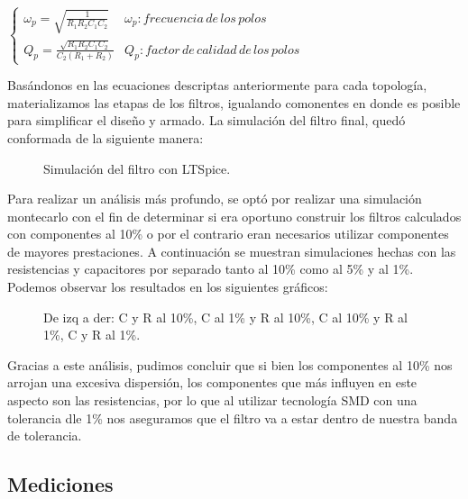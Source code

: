 \documentclass[../../ASSD_TP1_G7.tex]{subfiles}
\begin{document}
$\begin{cases}
\omega_{p}=\sqrt{\frac{1}{R_{1}R_{2}C_{1}C_{2}}} & \omega_{p}:frecuencia\,de\,los\,polos\\
Q_{p}=\frac{\sqrt{R_{1}R_{2}C_{1}C_{2}}}{C_{2}(R_{1}+R_{2})} & Q_{p}:factor\,de\,calidad\,de\,los\,polos
\end{cases}$

Basándonos en las ecuaciones descriptas anteriormente para cada topología,
materializamos las etapas de los filtros, igualando comonentes en
donde es posible para simplificar el diseño y armado. La simulación
del filtro final, quedó conformada de la siguiente manera:

\begin{figure}[H]

\caption{Simulación del filtro con LTSpice.}

\end{figure}

Para realizar un análisis más profundo, se optó por realizar una simulación
montecarlo con el fin de determinar si era oportuno construir los
filtros calculados con componentes al 10\% o por el contrario eran
necesarios utilizar componentes de mayores prestaciones. A continuación
se muestran simulaciones hechas con las resistencias y capacitores
por separado tanto al 10\% como al 5\% y al 1\%. Podemos observar
los resultados en los siguientes gráficos:

\begin{figure}[H]

\caption{De izq a der: C y R al 10\%, C al 1\% y R al 10\%, C al 10\% y R al
1\%, C y R al 1\%.}

\end{figure}

Gracias a este análisis, pudimos concluir que si bien los componentes
al 10\% nos arrojan una excesiva dispersión, los componentes que más
influyen en este aspecto son las resistencias, por lo que al utilizar
tecnología SMD con una tolerancia dle 1\% nos aseguramos que el filtro
va a estar dentro de nuestra banda de tolerancia.

\subsection{Mediciones}
\end{document}
